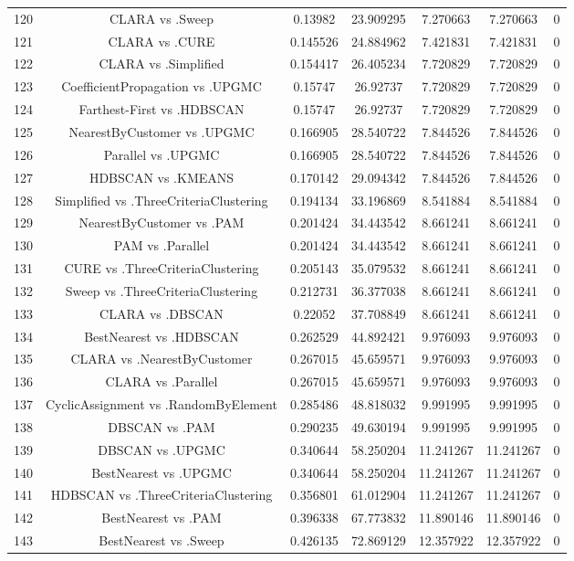 \documentclass[a4paper,10pt]{article}
\begin{document}
\begin{landscape}
\begin{table}[!htp]
\begin{tabular}{ccccccc}
120&CLARA vs .Sweep&0.13982&23.909295&7.270663&7.270663&0\\
121&CLARA vs .CURE&0.145526&24.884962&7.421831&7.421831&0\\
122&CLARA vs .Simplified&0.154417&26.405234&7.720829&7.720829&0\\
123&CoefficientPropagation vs .UPGMC&0.15747&26.92737&7.720829&7.720829&0\\
124&Farthest-First vs .HDBSCAN&0.15747&26.92737&7.720829&7.720829&0\\
125&NearestByCustomer vs .UPGMC&0.166905&28.540722&7.844526&7.844526&0\\
126&Parallel vs .UPGMC&0.166905&28.540722&7.844526&7.844526&0\\
127&HDBSCAN vs .KMEANS&0.170142&29.094342&7.844526&7.844526&0\\
128&Simplified vs .ThreeCriteriaClustering&0.194134&33.196869&8.541884&8.541884&0\\
129&NearestByCustomer vs .PAM&0.201424&34.443542&8.661241&8.661241&0\\
130&PAM vs .Parallel&0.201424&34.443542&8.661241&8.661241&0\\
131&CURE vs .ThreeCriteriaClustering&0.205143&35.079532&8.661241&8.661241&0\\
132&Sweep vs .ThreeCriteriaClustering&0.212731&36.377038&8.661241&8.661241&0\\
133&CLARA vs .DBSCAN&0.22052&37.708849&8.661241&8.661241&0\\
134&BestNearest vs .HDBSCAN&0.262529&44.892421&9.976093&9.976093&0\\
135&CLARA vs .NearestByCustomer&0.267015&45.659571&9.976093&9.976093&0\\
136&CLARA vs .Parallel&0.267015&45.659571&9.976093&9.976093&0\\
137&CyclicAssignment vs .RandomByElement&0.285486&48.818032&9.991995&9.991995&0\\
138&DBSCAN vs .PAM&0.290235&49.630194&9.991995&9.991995&0\\
139&DBSCAN vs .UPGMC&0.340644&58.250204&11.241267&11.241267&0\\
140&BestNearest vs .UPGMC&0.340644&58.250204&11.241267&11.241267&0\\
141&HDBSCAN vs .ThreeCriteriaClustering&0.356801&61.012904&11.241267&11.241267&0\\
142&BestNearest vs .PAM&0.396338&67.773832&11.890146&11.890146&0\\
143&BestNearest vs .Sweep&0.426135&72.869129&12.357922&12.357922&0\\

\end{tabular}
\end{table}
\end{landscape}
\end{document}
